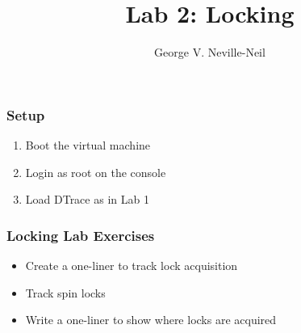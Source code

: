 \documentclass[pdftex,handout]{beamer}
\begin{document}

\title{Lab 2: Locking}
\author[shortname]{George V. Neville-Neil}

\begin{frame}
  \frametitle{Setup}
  \begin{enumerate}
  \item Boot the virtual machine
  \item Login as root on the console
  \item Load DTrace as in Lab 1
  \end{enumerate}
\end{frame}

\begin{frame}[fragile]
  \frametitle{Locking Lab Exercises}
  \begin{itemize}
  \item Create a one-liner to track lock acquisition
  \item Track spin locks
  \item Write a one-liner to show where locks are acquired
  \end{itemize}
\end{frame}
\end{document}
